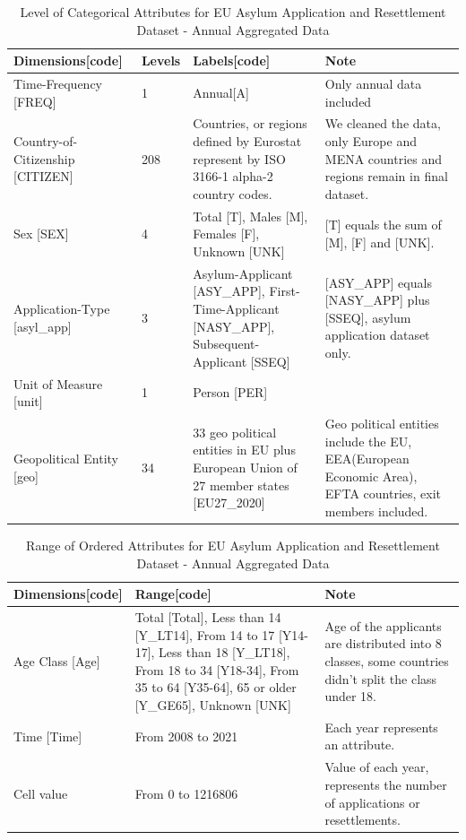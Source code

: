 \documentclass[journal]{vgtc}                %
\begin{document}
\begin{table}[]
  \caption{Level of Categorical Attributes for EU Asylum Application and Resettlement Dataset - Annual Aggregated Data}
  \label{tab:lev1}
  \scriptsize
	\centering
  \begin{tabularx}{\columnwidth}{XXXX}
    \toprule
    Dimensions[code] & Levels & Labels[code] & Note \\
    \midrule
    Time-Frequency [FREQ] & 1 & Annual[A] & Only annual data included \\
    Country-of-Citizenship [CITIZEN] & 208 & Countries, or regions defined by Eurostat represent by ISO 3166-1 alpha-2 country codes. & We cleaned the data, only Europe and MENA countries and regions remain in final dataset. \\
    Sex [SEX] & 4 & Total [T], Males [M], Females [F], Unknown [UNK] & [T] equals the sum of [M], [F] and [UNK]. \\
    Application-Type [asyl\_app] & 3 & Asylum-Applicant [ASY\_APP], First-Time-Applicant [NASY\_APP], Subsequent-Applicant [SSEQ] & [ASY\_APP] equals [NASY\_APP] plus [SSEQ], asylum application dataset only. \\
    Unit of Measure [unit] & 1 & Person [PER] & \\
    Geopolitical Entity [geo] & 34 & 33 geo political entities in EU plus European Union of 27 member states [EU27\_2020] & Geo political entities include the EU, EEA(European Economic Area), EFTA countries, exit members included.
  \end{tabularx}
\end{table}

\begin{table}[]
  \caption{Range of Ordered Attributes for EU Asylum Application and Resettlement Dataset - Annual Aggregated Data}
  \label{tab:lev2}
  \scriptsize
	\centering
  \begin{tabularx}{\columnwidth}{XXX}
    \toprule
    Dimensions[code] & Range[code] & Note \\
    \midrule
    Age Class [Age] & Total [Total], Less than 14 [Y\_LT14], From 14 to 17 [Y14-17], Less than 18 [Y\_LT18], From 18 to 34 [Y18-34], From 35 to 64 [Y35-64], 65 or older [Y\_GE65], Unknown [UNK] & Age of the applicants are distributed into 8 classes, some countries didn't split the class under 18. \\
    Time [Time] & From 2008 to 2021 & Each year represents an attribute. \\
    Cell value & From 0 to 1216806 & Value of each year, represents the number of applications or resettlements. \\
  \end{tabularx}
\end{table}
\end{document}

